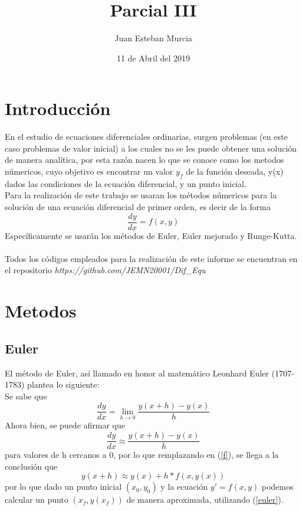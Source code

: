 \documentclass[12pt]{article}
\begin{document}
\title{Parcial III}
\author{Juan Esteban Murcia}
\date{11 de Abril del 2019}
\maketitle


\section{Introducción}
En el estudio de ecuaciones diferenciales ordinarias, surgen problemas (en este caso problemas de valor inicial) a los cuales no se les puede obtener una solución de manera analítica, por esta razón nacen lo que se conoce como los metodos númericos, cuyo objetivo es encontrar un valor $y_{f}$ de la función deseada, y(x) dados las condiciones de la ecuación diferencial, y un punto inicial.\\
Para la realización de este trabajo se usaran los métodos númericos para la solución de una ecuación diferencial de primer orden, es decir de la forma
\begin{equation}
\frac{dy}{dx} = f(x,y)
\label{f}
\end{equation}
Específicamente se usarán los métodos de Euler, Euler mejorado y Runge-Kutta.\\\\
Todos los códigos empleados para la realización de este informe se encuentran en el repositorio \textit{https://github.com/JEMN20001/Dif\_Equ}
\section{Metodos}
\subsection{Euler}
El método de Euler, así llamado en honor al matemático Leonhard Euler (1707-1783) plantea lo siguiente:\\

Se sabe que $$\frac{dy}{dx} = \lim\limits_{h\to0}\frac{y(x+h)-y(x)}{h}$$
Ahora bien, se puede afirmar que $$\frac{dy}{dx} \approx \frac{y(x+h)-y(x)}{h}$$ para valores de h cercanos a 0, por lo que remplazando en (\ref{f}), se llega a la conclusión que
\begin{equation}
 y(x+h) \approx y(x)+h*f(x,y(x))
 \label{euler}
\end{equation}
por lo que dado un punto inicial $(x_{0},y_{0})$ y la ecuación $y' = f(x,y)$ podemos calcular un punto $(x_{f},y(x_{f}))$ de manera aproximada, utilizando (\ref{euler}).
\end{document}
